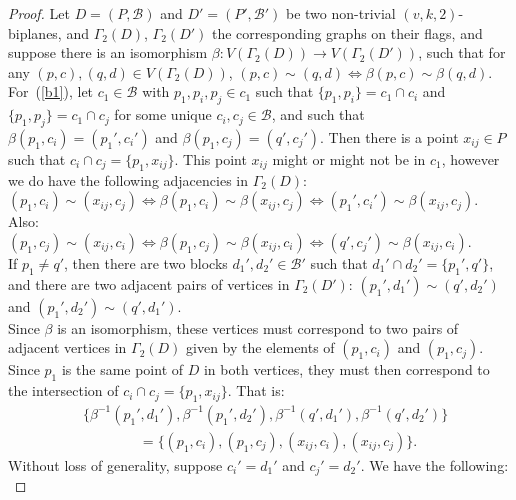 \documentclass[10pt,a4paper]{amsart}
\begin{document}
\begin{proof}
    Let $D=(P,\mathcal{B})$ and $D'=(P',\mathcal{B}')$ be two non-trivial $(v,k,2)$-biplanes, and $\Gamma_2(D)$, $\Gamma_2(D')$ the corresponding graphs on their flags, and suppose there is an isomorphism $\beta:V(\Gamma_2(D))\to V(\Gamma_2(D'))$, such that for any $(p,c),(q,d)\in V(\Gamma_2(D))$, $(p,c)\sim(q,d)\iff\beta(p,c)\sim\beta(q,d)$.\\
    
    For~(\ref{b1}), let $c_1\in\mathcal{B}$ with $p_1,p_i,p_j\in c_1$ such that $\{p_1,p_i\}=c_1\cap c_i$ and $\{p_1,p_j\}=c_1\cap c_j$ for some unique $c_i,c_j\in\mathcal{B}$, and such that $\beta(p_1,c_i)=(p_1',c_i')$ and $\beta(p_1,c_j)=(q',c_j')$. Then there is a point $x_{ij}\in P$ such that $c_i\cap c_j=\{p_1,x_{ij}\}$. This point $x_{ij}$ might or might not be in $c_1$, however we do have the following adjacencies in $\Gamma_2(D)$:\\

$(p_1,c_i)\sim(x_{ij},c_j)\iff\beta(p_1,c_i)\sim\beta(x_{ij},c_j)\iff(p_1',c_i')\sim\beta(x_{ij},c_j).$\\
    
    Also:\\
    
$(p_1,c_j)\sim(x_{ij},c_i)\iff\beta(p_1,c_j)\sim\beta(x_{ij},c_i)\iff(q',c_j')\sim\beta(x_{ij},c_i)$.\\

    If $p_1\neq q'$, then there are two blocks $d_1',d_2'\in\mathcal{B}'$ such that $d_1'\cap d_2'=\{p_1',q'\}$, and there are two adjacent pairs of vertices in $\Gamma_2(D')$: $(p_1',d_1')\sim(q',d_2')$ and $(p_1',d_2')\sim(q',d_1')$.\\

    Since $\beta$ is an isomorphism, these vertices must correspond to two pairs of adjacent vertices in $\Gamma_2(D)$ given by the elements of $(p_1,c_i)$ and $(p_1,c_j)$. Since $p_1$ is the same point of $D$ in both vertices, they must then correspond to the intersection of $c_i\cap c_j=\{p_1,x_{ij}\}$. That is:
    \begin{align*}
    &\{\beta^{-1}(p_1',d_1'),\beta^{-1}(p_1',d_2'),\beta^{-1}(q',d_1'),\beta^{-1}(q',d_2')\}\\
    &\qquad\qquad=\{(p_1,c_i),(p_1,c_j),(x_{ij},c_i),(x_{ij},c_j)\}.
\end{align*}
    Without loss of generality, suppose $c_i'=d_1'$ and $c_j'=d_2'$. We have the following:\\


\end{proof}
\end{document}
